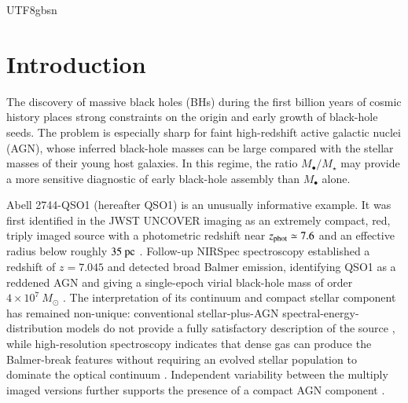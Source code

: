 \documentclass[trackchanges, twocolappendix, twocolumn]{aastex701}
\begin{document}
\begin{CJK*}{UTF8}{gbsn}

\section{Introduction}
\label{sec:intro}

The discovery of massive black holes (BHs) during the first billion years of
cosmic history places strong constraints on the origin and early growth of
black-hole seeds. The problem is especially sharp for faint high-redshift
active galactic nuclei (AGN), whose inferred black-hole masses can be large
compared with the stellar masses of their young host galaxies. In this regime,
the ratio $M_{\bullet}/M_\star$ may provide a more sensitive diagnostic of
early black-hole assembly than $M_{\bullet}$ alone.

Abell 2744-QSO1 (hereafter QSO1) is an unusually informative example. It was
first identified in the JWST UNCOVER imaging as an extremely compact, red,
triply imaged source with a photometric redshift near $z_{\rm phot}\simeq7.6$
and an effective radius below roughly $35~{\rm pc}$
\citep{Furtak2023}. Follow-up NIRSpec spectroscopy established a redshift of
$z=7.045$ and detected broad Balmer emission, identifying QSO1 as a reddened
AGN and giving a single-epoch virial black-hole mass of order
$4\times10^7~M_\odot$ \citep{Furtak2024}. The interpretation of its continuum
and compact stellar component has remained non-unique: conventional
stellar-plus-AGN spectral-energy-distribution models do not provide a fully
satisfactory description of the source \citep{Ma2025}, while high-resolution
spectroscopy indicates that dense gas can produce the Balmer-break features
without requiring an evolved stellar population to dominate the optical
continuum \citep{Ji2025}. Independent variability between the multiply imaged
versions further supports the presence of a compact AGN component
\citep{Furtak2025}.


\end{CJK*}
\end{document}
